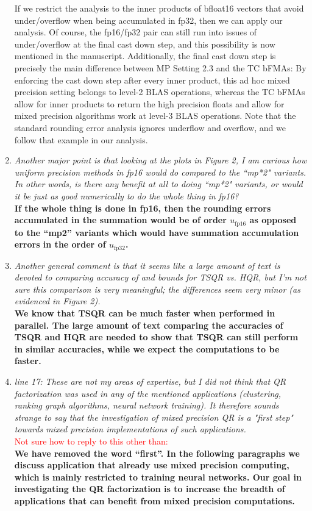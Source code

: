 \documentclass[final,onefignum,onetabnum]{siamart190516}
\newcommand{\red}[1]{\textcolor{red}{#1}}
\begin{document}
\begin{enumerate}
{	    If we restrict the analysis to the inner products of bfloat16 vectors that avoid under/overflow when being accumulated in fp32, then we can apply our analysis. 
	    Of course, the fp16/fp32 pair can still run into issues of under/overflow at the final cast down step, and this possibility is now mentioned in the manuscript.
	    Additionally, the final cast down step is precisely the main difference between MP Setting 2.3 and the TC bFMAs: By enforcing the cast down step after every inner product, this ad hoc mixed precision setting belongs to level-2 BLAS operations, whereas the TC bFMAs allow for inner products to return the high precision floats and allow for mixed precision algorithms work at level-3 BLAS operations.   
        Note that the standard rounding error analysis ignores underflow and overflow, and we follow that example in our analysis. 
    }
	
	\item {\it Another major point is that looking at the plots in Figure 2, I am curious how uniform precision methods in fp16 would do compared to the ``mp*2" variants. In other words, is there any benefit at all to doing ``mp*2" variants, or would it be just as good numerically to do the whole thing in fp16?}\\
	{\bf If the whole thing is done in fp16, then the rounding errors accumulated in the summation would be of order $u_{\text{fp16}}$  as opposed to the ``mp2'' variants which would have summation accumulation errors in the order of $u_{\text{fp32}}$.}
	
	\item {\it Another general comment is that it seems like a large amount of text is devoted to comparing accuracy of and bounds for TSQR vs. HQR, but I'm not sure this comparison is very meaningful; the differences seem very minor (as evidenced in Figure 2).}\\
	{\bf We know that TSQR can be much faster when performed in parallel. The large amount of text comparing the accuracies of TSQR and HQR are needed to show that TSQR can still perform in similar accuracies, while we expect the computations to be faster.}
	
	\item {\it line 17: These are not my areas of expertise, but I did not think that QR factorization was used in any of the mentioned applications (clustering, ranking graph algorithms, neural network training). It therefore sounds strange to say that the investigation of mixed precision QR is a "first step" towards mixed precision implementations of such applications.}\\
	\red{ Not sure how to reply to this other than: }\\
	{\bf We have removed the word ``first''. 
	In the following paragraphs we discuss application that already use mixed precision computing, which is mainly restricted to training neural networks. 
	Our goal in investigating the QR factorization is to increase the breadth of applications that can benefit from mixed precision computations.
}
	

\end{enumerate}
\end{document}
